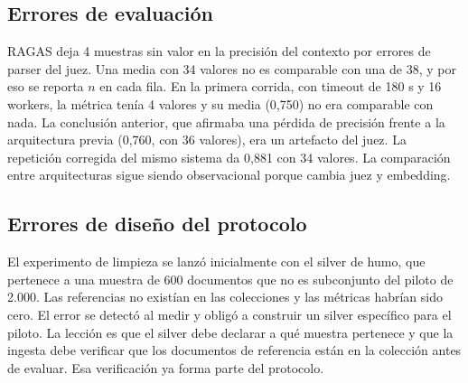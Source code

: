 \subsection{Errores de evaluaci\'on}

RAGAS deja 4 muestras sin valor en la precisi\'on del contexto por errores de parser del juez. Una media con 34 valores no es comparable con una de 38, y por eso se reporta $n$ en cada fila. En la primera corrida, con timeout de 180 s y 16 workers, la m\'etrica ten\'ia 4 valores y su media (0,750) no era comparable con nada. La conclusi\'on anterior, que afirmaba una p\'erdida de precisi\'on frente a la arquitectura previa (0,760, con 36 valores), era un artefacto del juez. La repetici\'on corregida del mismo sistema da 0,881 con 34 valores. La comparaci\'on entre arquitecturas sigue siendo observacional porque cambia juez y embedding.

\subsection{Errores de dise\~no del protocolo}

El experimento de limpieza se lanz\'o inicialmente con el silver de humo, que pertenece a una muestra de 600 documentos que no es subconjunto del piloto de 2.000. Las referencias no exist\'ian en las colecciones y las m\'etricas habr\'ian sido cero. El error se detect\'o al medir y oblig\'o a construir un silver espec\'ifico para el piloto. La lecci\'on es que el silver debe declarar a qu\'e muestra pertenece y que la ingesta debe verificar que los documentos de referencia est\'an en la colecci\'on antes de evaluar. Esa verificaci\'on ya forma parte del protocolo.
